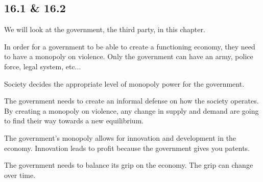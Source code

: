 \subsection*{16.1 \& 16.2}
We will look at the government, the third party, in this chapter.
\par
In order for a government to be able to create a functioning economy, 
they need to have a monopoly on violence. Only the government can have an army,
police force, legal system, etc...
\par
Society decides the appropriate level of monopoly power for the government.
\par
The government needs to create an informal defense on how the society operates.
By creating a monopoly on violence, any change in supply and demand are going to 
find their way towards a new equilibrium.
\par
The government's monopoly allows for innovation and development in the economy.
Innovation leads to profit because the government gives you patents.
\par
The government needs to balance its grip on the economy.
The grip can change over time.